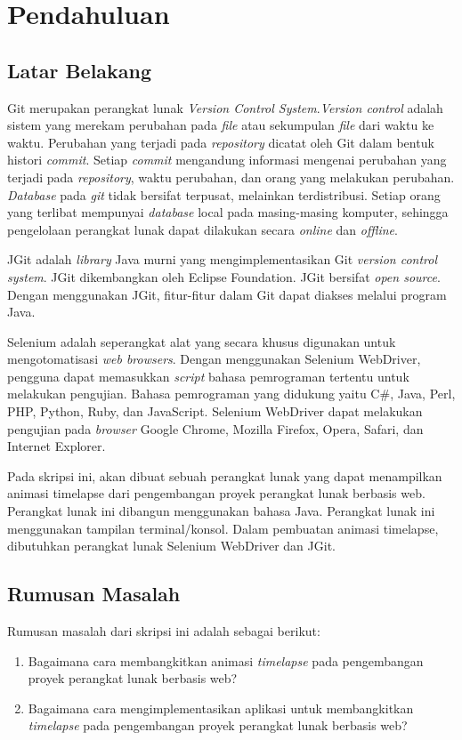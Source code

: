 \chapter{Pendahuluan}
\label{chap:intro}
   
\section{Latar Belakang}
\label{sec:label}
Git merupakan perangkat lunak \textit{Version Control System}\cite{chacon2014pro}.\textit{Version control} adalah sistem yang merekam perubahan pada \textit{file} atau sekumpulan \textit{file} dari waktu ke waktu. Perubahan yang terjadi pada \textit{repository} dicatat oleh Git dalam bentuk histori \textit{commit}. Setiap \textit{commit} mengandung informasi mengenai perubahan yang terjadi pada \textit{repository}, waktu perubahan, dan orang yang melakukan perubahan. \textit{Database} pada \textit{git} tidak bersifat terpusat, melainkan terdistribusi. Setiap orang yang terlibat mempunyai \textit{database} local pada masing-masing komputer, sehingga pengelolaan perangkat lunak dapat dilakukan secara \textit{online} dan \textit{offline}.

JGit adalah \textit{library} Java murni yang mengimplementasikan Git \textit{version control system}\cite{JGit}. JGit dikembangkan oleh Eclipse Foundation. JGit bersifat \textit{open source}. Dengan menggunakan JGit, fitur-fitur dalam Git dapat diakses melalui program Java. 

Selenium adalah seperangkat alat yang secara khusus digunakan untuk mengotomatisasi \textit{web browsers}\cite{Selenium}. Dengan menggunakan Selenium WebDriver, pengguna dapat memasukkan \textit{script} bahasa pemrograman tertentu untuk melakukan pengujian. Bahasa pemrograman yang didukung yaitu C\#, Java, Perl, PHP, Python, Ruby, dan JavaScript. Selenium WebDriver dapat melakukan pengujian pada \textit{browser} Google Chrome, Mozilla Firefox, Opera, Safari, dan Internet Explorer.  
  
Pada skripsi ini, akan dibuat sebuah perangkat lunak yang dapat menampilkan animasi timelapse dari pengembangan proyek perangkat lunak berbasis web. Perangkat lunak ini dibangun menggunakan bahasa Java. Perangkat lunak ini menggunakan tampilan terminal/konsol. Dalam pembuatan animasi timelapse, dibutuhkan perangkat lunak Selenium WebDriver dan JGit.

\section{Rumusan Masalah}
\label{sec:rumusan}
Rumusan masalah dari skripsi ini adalah sebagai berikut:
\begin{enumerate}
	\item Bagaimana cara membangkitkan animasi \textit{timelapse} pada pengembangan proyek perangkat lunak berbasis web?
	\item Bagaimana cara mengimplementasikan aplikasi untuk membangkitkan \textit{timelapse} pada pengembangan proyek perangkat lunak berbasis web?
\end{enumerate}

